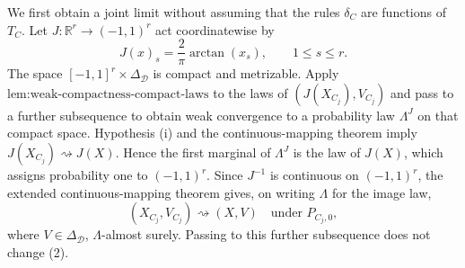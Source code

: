 We first obtain a joint limit without assuming that the rules \(\delta_C\) are functions of \(T_C\).  Let \(J\colon\mathbb R^r\to(-1,1)^r\) act coordinatewise by
\[
 J(x)_s=\frac{2}{\pi}\arctan(x_s),\qquad 1\leq s\leq r.
\]
The space \([-1,1]^r\times\Delta_{\mathcal D}\) is compact and metrizable.  Apply \(\text{lem:weak-compactness-compact-laws}\) to the laws of \((J(X_{C_j}),V_{C_j})\) and pass to a further subsequence to obtain weak convergence to a probability law \(\Lambda^J\) on that compact space.  Hypothesis (i) and the continuous-mapping theorem imply \(J(X_{C_j})\rightsquigarrow J(X)\).  Hence the first marginal of \(\Lambda^J\) is the law of \(J(X)\), which assigns probability one to \((-1,1)^r\).  Since \(J^{-1}\) is continuous on \((-1,1)^r\), the extended continuous-mapping theorem gives, on writing \(\Lambda\) for the image law,
\[
 (X_{C_j},V_{C_j})\rightsquigarrow(X,V)
 \quad\text{under }P_{C_j,0},
 \tag{3}
\]
where \(V\in\Delta_{\mathcal D}\), \(\Lambda\)-almost surely.  Passing to this further subsequence does not change (2).


